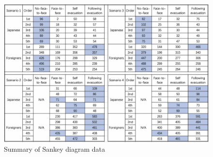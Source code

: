 \begin{figure}[h]
  \includegraphics[width=\linewidth]{Figure/Figure28.jpg}
  \centering
  \caption{Summary of Sankey diagram data}
  \label{fig28}
\end{figure}







